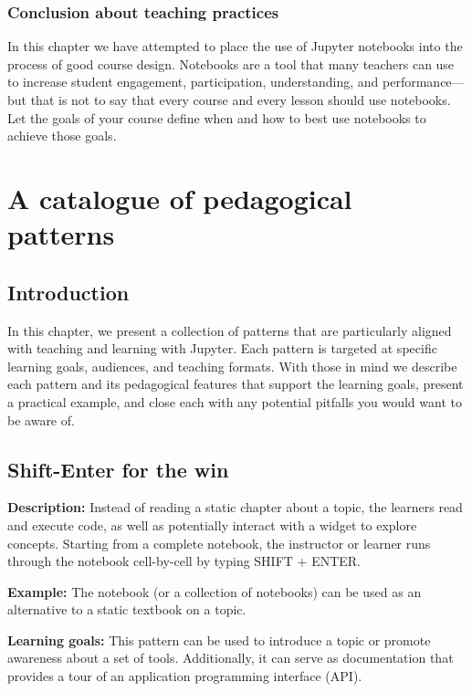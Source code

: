 \documentclass[]{book}
\begin{document}
\subsection{Conclusion about teaching
practices}\label{conclusion-about-teaching-practices}

In this chapter we have attempted to place the use of Jupyter notebooks
into the process of good course design. Notebooks are a tool that many
teachers can use to increase student engagement, participation,
understanding, and performance---but that is not to say that every
course and every lesson should use notebooks. Let the goals of your
course define when and how to best use notebooks to achieve those goals.

\hypertarget{catalogue}{\chapter{A catalogue of pedagogical
patterns}\label{catalogue}}

\section{Introduction}\label{introduction-1}

In this chapter, we present a collection of patterns that are
particularly aligned with teaching and learning with Jupyter. Each
pattern is targeted at specific learning goals, audiences, and teaching
formats. With those in mind we describe each pattern and its pedagogical
features that support the learning goals, present a practical example,
and close each with any potential pitfalls you would want to be aware
of.

\section{Shift-Enter for the win}\label{shift-enter-for-the-win}

\textbf{Description:} Instead of reading a static chapter about a topic,
the learners read and execute code, as well as potentially interact with
a widget to explore concepts. Starting from a complete notebook, the
instructor or learner runs through the notebook cell-by-cell by typing
SHIFT + ENTER.

\textbf{Example:} The notebook (or a collection of notebooks) can be
used as an alternative to a static textbook on a topic.

\textbf{Learning goals:} This pattern can be used to introduce a topic
or promote awareness about a set of tools. Additionally, it can serve as
documentation that provides a tour of an application programming
interface (API).
\end{document}
